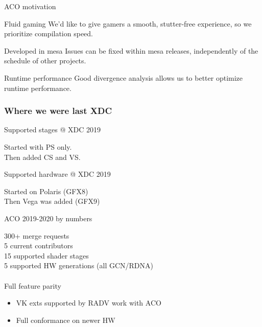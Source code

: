 \documentclass[aspectratio=169,t,xcolor=table]{beamer}
\begin{document}
\begin{frame}{ACO motivation}

    \footnotesize

    \begin{block}{Fluid gaming}
        We'd like to give gamers a smooth, stutter-free experience, so we prioritize compilation speed.
    \end{block}

    \begin{block}{Developed in mesa}
        Issues can be fixed within mesa releases, independently of the schedule of other projects.
    \end{block}

    \begin{block}{Runtime performance}
        Good divergence analysis allows us to better optimize runtime performance.
    \end{block}

\end{frame}

\begin{frame}{}
    \frametitle{Where we were last XDC}
\end{frame}

\begin{frame}{Supported stages @ XDC 2019}

    \LARGE
    Started with PS only. \\
    Then added CS and VS.

\end{frame}

\begin{frame}{Supported hardware @ XDC 2019}

    \LARGE
    Started on Polaris (GFX8) \\
    Then Vega was added (GFX9)

\end{frame}

\begin{frame}{ACO 2019-2020 by numbers}

    \LARGE
    300+ merge requests \\
    5 current contributors \\
    15 supported shader stages \\
    5 supported HW generations (all GCN/RDNA) \\
    \ \\
    \normalsize
    Full feature parity
    \LARGE
    \begin{itemize}
    	\item VK exts supported by RADV work with ACO
    	\item Full conformance on newer HW
    \end{itemize}

\end{frame}
\end{document}
